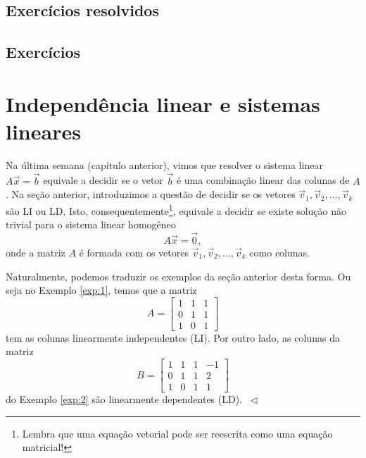 \documentclass[../livro.tex]{subfiles}
\begin{document}
\subsection*{Exercícios resolvidos}

\construirExeresol

\subsection*{Exercícios}

\construirExer


\section{Independência linear e sistemas lineares}

Na última semana (capítulo anterior), vimos que resolver o sistema linear $A \vec{x} = \vec{b}$ equivale a decidir se o vetor $\vec{b}$ é uma combinação linear das colunas de $A$. Na seção anterior, introduzimos a questão de decidir se os vetores $\vec{v}_1, \vec{v}_2, \dots, \vec{v}_k$ são LI ou LD. Isto, consequentemente\footnote{Lembra que uma equação vetorial pode ser reescrita como uma equação matricial!}, equivale a decidir se existe solução não trivial para o sistema linear homogêneo
\begin{equation}
A \vec{x} = \vec{0},
\end{equation} onde a matriz $A$ é formada com os vetores $\vec{v}_1, \vec{v}_2, \dots, \vec{v}_k$ como colunas.

\begin{example}
Naturalmente, podemos traduzir os exemplos da seção anterior desta forma. Ou seja no Exemplo \ref{exp:1}, temos que a matriz
\begin{equation}
A = \left[
  \begin{array}{ccc}
    1 & 1 & 1  \\
    0 & 1 & 1   \\
    1 & 0 & 1 
    \end{array}
\right]
\end{equation} tem as colunas linearmente independentes (LI). Por outro lado, as colunas da matriz
\begin{equation}
B = \left[
  \begin{array}{cccc}
    1 & 1 & 1 & -1 \\
    0 & 1 & 1 & 2  \\
    1 & 0 & 1 & 1 
  \end{array}
\right]
\end{equation} do Exemplo \ref{exp:2} são linearmente dependentes (LD). $\ \lhd$
\end{example}
\end{document}

